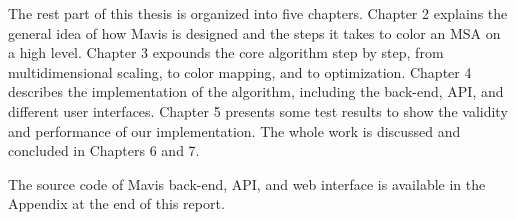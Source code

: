 The rest part of this thesis is organized into five chapters. Chapter 2 explains the general idea of how Mavis is designed and the steps it takes to color an MSA on a high level. Chapter 3 expounds the core algorithm step by step, from multidimensional scaling, to color mapping, and to optimization. Chapter 4 describes the implementation of the algorithm, including the back-end, API, and different user interfaces. Chapter 5 presents some test results to show the validity and performance of our implementation. The whole work is discussed and concluded in Chapters 6 and 7.

The source code of Mavis back-end, API, and web interface is available in the Appendix at the end of this report.
